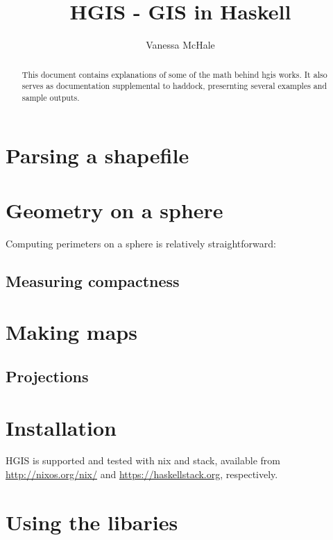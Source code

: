 \documentclass{article}
\begin{document}
\title{HGIS - GIS in Haskell}
\author{Vanessa McHale}

\maketitle

\begin{abstract}
This document contains explanations of some of the math behind hgis works. It
also serves as documentation supplemental to haddock, presernting several
examples and sample outputs. 
\end{abstract}

\tableofcontents

\section{Parsing a shapefile}

\section{Geometry on a sphere}

Computing perimeters on a sphere is relatively straightforward: 

\subsection{Measuring compactness}

\section{Making maps}

\subsection{Projections}

\begin{appendices}
  \section{Installation}
  HGIS is supported and tested with nix and stack, available from
  \url{http://nixos.org/nix/} and \url{https://haskellstack.org}, respectively.

  \section{Using the libaries}
\end{appendices}
\end{document}
